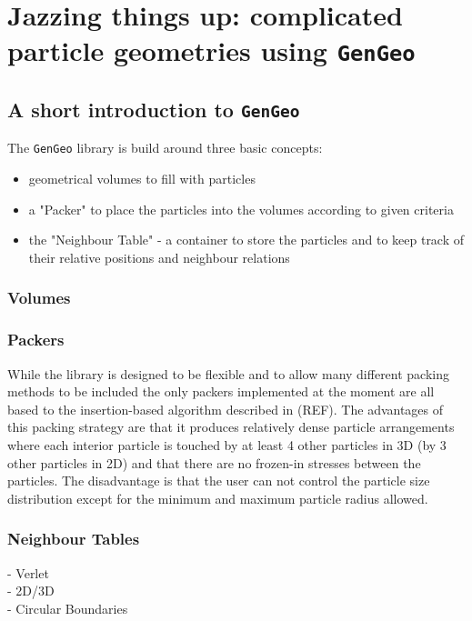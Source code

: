 \chapter[GenGeo]{Jazzing things up: complicated particle geometries using \texttt{GenGeo}}

\section{A short introduction to \texttt{GenGeo}}
The \texttt{GenGeo} library is build around three basic concepts:
\begin{itemize}
\item geometrical volumes to fill with particles  
\item a "Packer" to place the particles into the volumes according to given criteria 
\item the "Neighbour Table" - a container to store the particles and to keep track of their relative positions and neighbour relations 
\end{itemize}

\subsection{Volumes}

\subsection{Packers}
While the library is designed to be flexible and to allow many different packing methods to be included the only packers implemented at the moment are all based to the insertion-based algorithm described in (REF). The advantages of this packing strategy are that it produces relatively dense particle arrangements where each interior particle is touched by at least 4 other particles in 3D (by 3 other particles in 2D) and that there are no frozen-in stresses between the particles. The disadvantage is that the user can not control the particle size distribution except for the minimum and maximum particle radius allowed.  

\subsection{Neighbour Tables}
- Verlet \\
- 2D/3D \\
- Circular Boundaries \\

